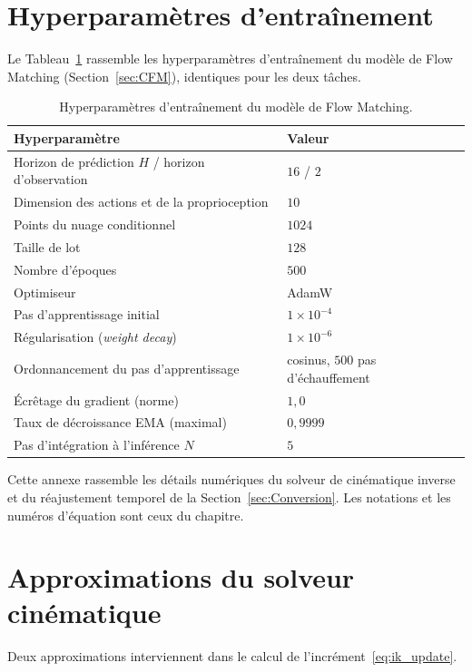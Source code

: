\section*{Hyperparamètres d'entraînement}
Le Tableau~\ref{tab:fm_hyperparams} rassemble les hyperparamètres d'entraînement du modèle de Flow Matching (Section~\ref{sec:CFM}), identiques pour les deux tâches.

\begin{table}[htbp]
\centering
\caption{Hyperparamètres d'entraînement du modèle de Flow Matching.}
\label{tab:fm_hyperparams}
\begin{tabular}{ll}
\toprule
Hyperparamètre & Valeur \\
\midrule
Horizon de prédiction $H$ / horizon d'observation & $16$ / $2$ \\
Dimension des actions et de la proprioception & $10$ \\
Points du nuage conditionnel & $1024$ \\
Taille de lot & $128$ \\
Nombre d'époques & $500$ \\
Optimiseur & AdamW \\
Pas d'apprentissage initial & $1\times10^{-4}$ \\
Régularisation (\textit{weight decay}) & $1\times10^{-6}$ \\
Ordonnancement du pas d'apprentissage & cosinus, $500$ pas d'échauffement \\
Écrêtage du gradient (norme) & $1{,}0$ \\
Taux de décroissance EMA (maximal) & $0{,}9999$ \\
Pas d'intégration à l'inférence $N$ & $5$ \\
\bottomrule
\end{tabular}
\end{table}

\label{annexe:chaine_nominale}

Cette annexe rassemble les détails numériques du solveur de cinématique inverse et du réajustement temporel de la Section~\ref{sec:Conversion}. Les notations et les numéros d'équation sont ceux du chapitre.

\section*{Approximations du solveur cinématique}

Deux approximations interviennent dans le calcul de l'incrément~\eqref{eq:ik_update}.

